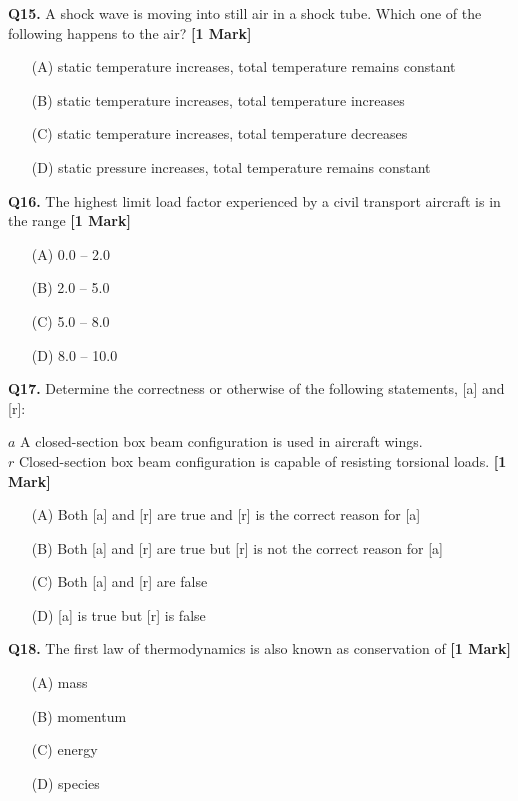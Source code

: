 \documentclass[11pt]{article}
\newcommand{\questiona}[2]{
    \noindent\textbf{Q#2.} #1 \hfill \textbf{[1 Mark]}
}
\begin{document}
\vspace{0.5cm}

\questiona{A shock wave is moving into still air in a shock tube. Which one of the following happens to the air?}{15}
\begin{enumerate}
    \item[(A)] static temperature increases, total temperature remains constant  
    \item[(B)] static temperature increases, total temperature increases  
    \item[(C)] static temperature increases, total temperature decreases  
    \item[(D)] static pressure increases, total temperature remains constant  
\end{enumerate}

\vspace{0.5cm}

\questiona{The highest limit load factor experienced by a civil transport aircraft is in the range}{16}
\begin{enumerate}
    \item[(A)] 0.0 -- 2.0  
    \item[(B)] 2.0 -- 5.0  
    \item[(C)] 5.0 -- 8.0  
    \item[(D)] 8.0 -- 10.0  
\end{enumerate}

\vspace{0.5cm}

\questiona{Determine the correctness or otherwise of the following statements, [a] and [r]: 

\(a\) A closed-section box beam configuration is used in aircraft wings. \\
\(r\) Closed-section box beam configuration is capable of resisting torsional loads.}{17}
\begin{enumerate}
    \item[(A)] Both [a] and [r] are true and [r] is the correct reason for [a]  
    \item[(B)] Both [a] and [r] are true but [r] is not the correct reason for [a]  
    \item[(C)] Both [a] and [r] are false  
    \item[(D)] [a] is true but [r] is false  
\end{enumerate}

\vspace{0.5cm}

\questiona{The first law of thermodynamics is also known as conservation of}{18}
\begin{enumerate}
    \item[(A)] mass  
    \item[(B)] momentum  
    \item[(C)] energy  
    \item[(D)] species  
\end{enumerate}
\end{document}
